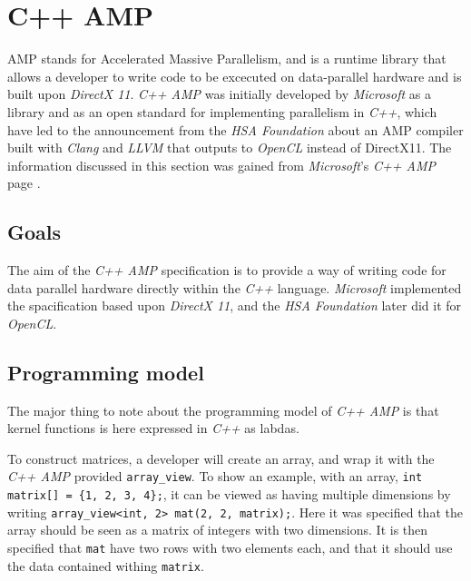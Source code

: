 \section{C++ AMP}
AMP stands for Accelerated Massive Parallelism, and is a runtime library that allows a developer to write code to be excecuted on data-parallel hardware and is built upon \textit{DirectX 11}. \textit{C++ AMP} was initially developed by \textit{Microsoft} as a library and as an open standard for implementing parallelism in \textit{C++}, which have led to the announcement from the \textit{HSA Foundation} about an AMP compiler built with \textit{Clang} and \textit{LLVM} that outputs to \textit{OpenCL} instead of DirectX11. The information discussed in this section was gained from \textit{Microsoft}'s \textit{C++ AMP} page \cite{microsoftCppAMP}.

\subsection{Goals}
The aim of the \textit{C++ AMP} specification is to provide a way of writing code for data parallel hardware directly within the \textit{C++} language. \textit{Microsoft} implemented the spacification based upon \textit{DirectX 11}, and the \textit{HSA Foundation} later did it for \textit{OpenCL}.

\subsection{Programming model}
The major thing to note about the programming model of \textit{C++ AMP} is that kernel functions is here expressed in \textit{C++} as labdas. 

To construct matrices, a developer will create an array, and wrap it with the \textit{C++ AMP} provided \texttt{array\_view}. To show an example, with an array, \texttt{int matrix[] = \{1, 2, 3, 4\};}, it can be viewed as having multiple dimensions by writing \texttt{array\_view<int, 2> mat(2, 2, matrix);}. Here it was specified that the array should be seen as a matrix of integers with two dimensions. It is then specified that \texttt{mat} have two rows with two elements each, and that it should use the data contained withing \texttt{matrix}.

